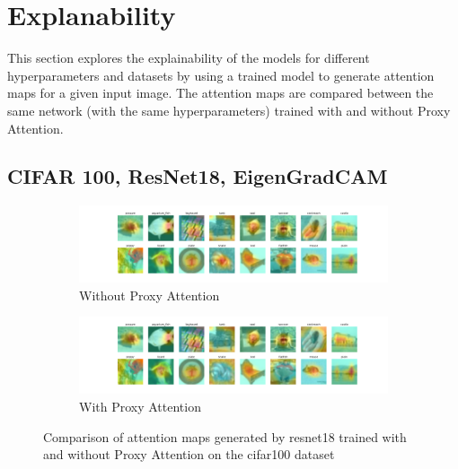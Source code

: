 \section{Explanability}
This section explores the explainability of the models for different hyperparameters and datasets by using a trained model to generate attention maps for a given input image. The attention maps are compared between the same network (with the same hyperparameters) trained with and without Proxy Attention.

\subsection{CIFAR 100, ResNet18, EigenGradCAM}
\begin{figure}[H]
    \begin{subfigure}[b]{1\textwidth}
        \includegraphics[width=\linewidth]{images/cifar100_resnet18_noproxy_0.pdf}
        \caption{Without Proxy Attention}
    \end{subfigure}
    \begin{subfigure}[b]{1\textwidth}
        \includegraphics[width=\linewidth]{images/cifar100_resnet18_proxy_0.pdf}
        \caption{With Proxy Attention}
    \end{subfigure}
    
    \caption{Comparison of attention maps generated by resnet18 trained with and without Proxy Attention on the cifar100 dataset}
    \label{fig:resnet18_cifar100}
\end{figure}


